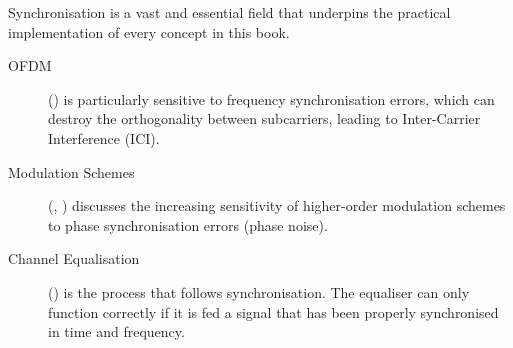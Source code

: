 \begin{importantbox}[title={Further Reading}]
    Synchronisation is a vast and essential field that underpins the practical implementation of every concept in this book.
    \begin{description}
        \item[OFDM] () is particularly sensitive to frequency synchronisation errors, which can destroy the orthogonality between subcarriers, leading to Inter-Carrier Interference (ICI).
        \item[Modulation Schemes] (, ) discusses the increasing sensitivity of higher-order modulation schemes to phase synchronisation errors (phase noise).
        \item[Channel Equalisation] () is the process that follows synchronisation. The equaliser can only function correctly if it is fed a signal that has been properly synchronised in time and frequency.
    \end{description}
\end{importantbox}